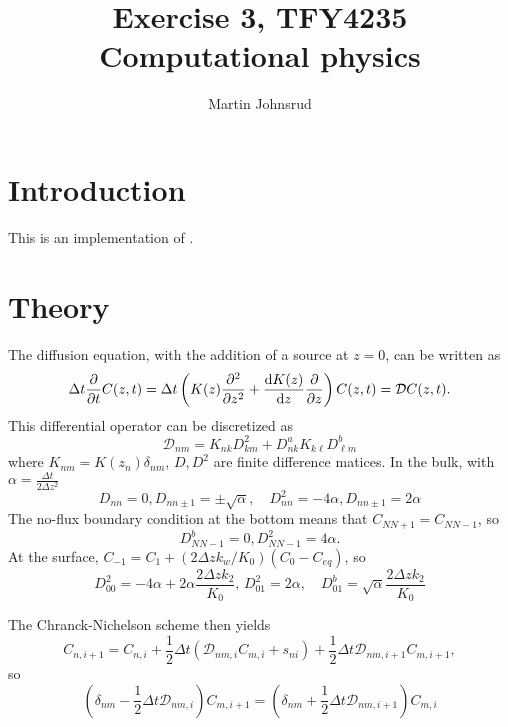\documentclass{article}
\title{Exercise 3, TFY4235 Computational physics}
\author{Martin Johnsrud}
\date{}
\begin{document}
    \maketitle
    \section*{Introduction}
        This is an implementation of \cite{exercise}.
    \section*{Theory}
    The diffusion equation, with the addition of a source at $z=0$, can be written as
    \begin{equation*}
        \Delta t \pdv{t} C(z, t) = \Delta t \left(K(z) \pdv[2]{z} + \dv{K(z)}{z}\pdv{z}\right) C(z, t) = \mathcal{D} C(z, t).
    \end{equation*}
    This differential operator can be discretized as 
    \begin{equation*}
        \mathcal{D}_{nm } = K_{nk} D^2_{km} + D^a_{nk}K_{k\ell}D^b_{\ell m}
    \end{equation*}
    where $K_{nm} = K(z_n) \delta_{nm}$, $D, D^2$ are finite difference matices. In the bulk, with $\alpha = \frac{\Delta t}{2 \Delta z^2}$
    \begin{equation*}
        D_{nn} =  0, D_{nn\pm1} = \pm\sqrt \alpha, \quad D^2_{nn} = -4 \alpha, D_{nn\pm1} = 2 \alpha  
    \end{equation*}
    The no-flux boundary condition at the bottom means that $C_{NN+1} = C_{NN-1}$, so 
    \begin{equation*}
        D^b_{NN-1} = 0, D^2_{NN-1} = 4 \alpha.
    \end{equation*}
    At the surface, $C_{-1} = C_{1} + (2 \Delta z k_w /K_0 )(C_0 - C_{eq})$, so 
    \begin{equation*}
        D^2_{00} = -4 \alpha + 2 \alpha \frac{2 \Delta z k_2}{K_0},\, D^2_{01} = 2\alpha, \quad D^b_{01} = \sqrt \alpha \frac{2 \Delta z k_2}{K_0}
    \end{equation*}
    
    The Chranck-Nichelson scheme then yields
    \begin{equation*}
        C_{n, i+1}  = C_{n, i} + \frac{1}{2} \Delta t (\mathcal{D}_{nm, i} C_{m, i} + s_{ni}) + \frac{1}{2} \Delta t \mathcal{D}_{nm, i+1}C_{m, i+1},
    \end{equation*}
    so 
    \begin{equation*}
        \left(\delta_{nm} - \frac{1}{2} \Delta t \mathcal{D}_{nm, i}\right) C_{m, i+1} = \left(\delta_{nm} + \frac{1}{2} \Delta t \mathcal{D}_{nm, i+1}\right) C_{m, i}
    \end{equation*}
    
    
\end{document}
